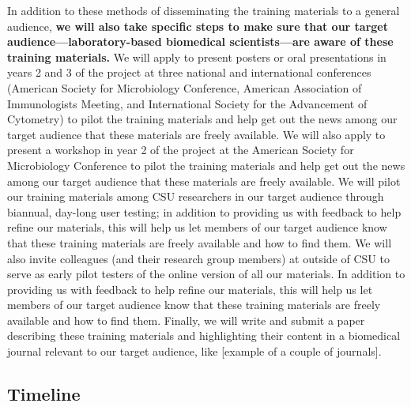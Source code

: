 \documentclass[pdftex,english,11pt,parskip=half]{scrartcl}
\begin{document}
In addition to these methods of disseminating the training materials to a general audience, \textbf{we will also take specific steps to make sure that our target audience---laboratory-based biomedical scientists---are aware of these training materials.} We will apply to present posters or oral presentations in years 2 and 3 of the project at three national and international conferences (American Society for Microbiology Conference, American Association of Immunologists Meeting, and International Society for the Advancement of Cytometry) to pilot the training materials and help get out the news among our target audience that these materials are freely available. We will also apply to present a workshop in year 2 of the project at the American Society for Microbiology Conference to pilot the training materials and help get out the news among our target audience that these materials are freely available. We will pilot our training materials among CSU researchers in our target audience through biannual, day-long user testing; in addition to providing us with feedback to help refine our materials, this will help us let members of our target audience know that these training materials are freely available and how to find them. We will also invite colleagues (and their research group members) at outside of CSU to serve as early pilot testers of the online version of all our materials. In addition to providing us with feedback to help refine our materials, this will help us let members of our target audience know that these training materials are freely available and how to find them. Finally, we will write and submit a paper describing these training materials and highlighting their content in a biomedical journal relevant to our target audience, like [example of a couple of journals].

\subsection{Timeline}
\end{document}
